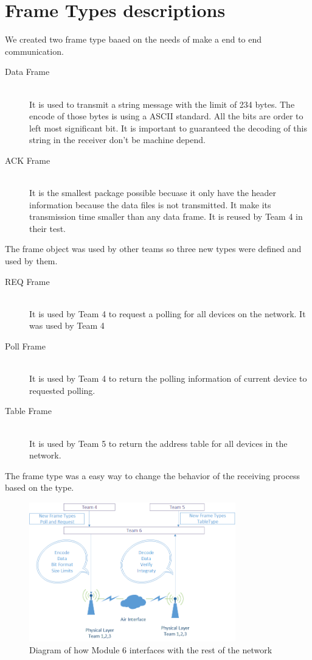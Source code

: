 \section{Frame Types descriptions}
We created two frame type baaed on the needs of make a end to end communication.

\begin{description}
  \item[Data Frame] \hfill \\
  It is used to transmit a string message with the limit of 234 bytes. The encode of those bytes is using a ASCII standard. All the bits are order to left most significant bit.
	It is important to guaranteed the decoding of this string in the receiver don’t be machine depend. 
	
  \item[ACK Frame] \hfill \\
  It is the smallest package possible becuase it only have the header information because the data files is not transmitted. It make its transmission time smaller than any data frame. It is reused by Team 4 in their test. 
\end{description}

The frame object was used by other teams so three new types were defined and used by them.
\begin{description}
  \item[REQ Frame] \hfill \\
It is used by Team 4 to request a polling for all devices on the network. It was used by Team 4
	
  \item[Poll Frame] \hfill \\
 It is used by Team 4 to return the polling information of current device to requested polling. 
  \item[Table Frame] \hfill \\
 It is used by Team 5 to return the address table for all devices in the network.

\end{description} 

The frame type was a easy way to change the behavior of the receiving process based on the type.  


\begin{figure}[ht]
    \centering
    \includegraphics[width=0.8\textwidth]{Interface_diagram.PNG}
    \caption{Diagram of how Module 6 interfaces with the rest of the network}
    \label{fig:Interface}
\end{figure}